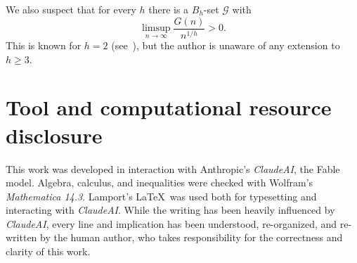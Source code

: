 \documentclass[10pt,letterpaper]{article}
\newcommand{\cG}{\mathcal{G}}
\theoremstyle{remark}
\begin{document}
We also suspect that for every $h$ there is a $B_h$-set $\cG$ with
  \[ \limsup_{n\to\infty} \frac{G(n)}{n^{1/h}} > 0.\]
This is known for $h=2$ (see~\cite{1961.Kruckeberg}), but the author is unaware of any extension to $h\ge3$.

\section*{Tool and computational resource disclosure}
This work was developed in interaction with Anthropic's \emph{ClaudeAI}, the Fable model. 
Algebra, calculus, and inequalities were checked with Wolfram's \emph{Mathematica 14.3}.
Lamport's \LaTeX\ was used both for typesetting and interacting with \emph{ClaudeAI}. 
While the writing has been heavily influenced by \emph{ClaudeAI}, every line and implication has been understood, re-organized, and re-written by the human author, who takes responsibility for the correctness and clarity of this work.
\end{document}
